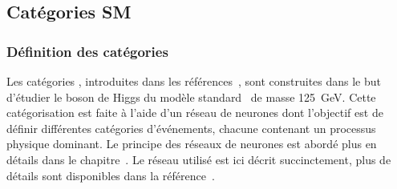\subsection{Catégories \og SM \fg{}}\label{chapter-HTT_analysis-section-categorisation-SM}
\subsubsection{Définition des catégories}
Les catégories \CATsm, introduites dans les références~\cite{CMS-NOTE-2019-177,CMS-NOTE-2019-178}, sont construites dans le but d'étudier le boson de Higgs du modèle standard \higgs\ de masse \SI{125}{\GeV}.
Cette catégorisation est faite à l'aide d'un réseau de neurones dont l'objectif est de définir différentes catégories d'événements, chacune contenant un processus physique dominant.
Le principe des réseaux de neurones est abordé plus en détails dans le chapitre~.
Le réseau utilisé est ici décrit succinctement, plus de détails sont disponibles dans la référence~\cite{CMS-NOTE-2019-178}.
